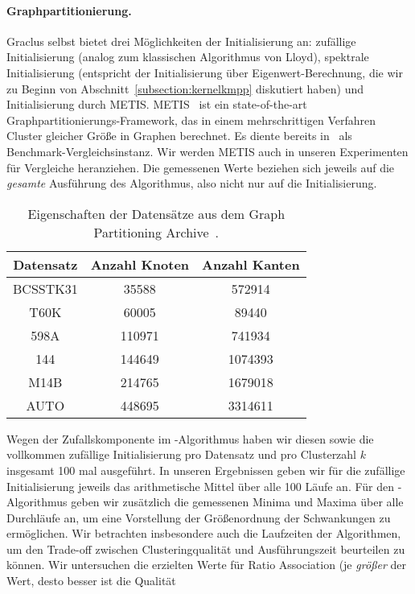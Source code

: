 \paragraph{Graphpartitionierung.} Graclus selbst bietet drei Möglichkeiten der Initialisierung an: zufällige Initialisierung (analog zum klassischen Algorithmus
von Lloyd), spektrale Initialisierung (entspricht der Initialisierung über Eigenwert-Berechnung, die wir zu Beginn von
Abschnitt~\ref{subsection:kernelkmpp} diskutiert haben) und Initialisierung durch METIS. METIS~\cite{KarypisK98} ist ein
state-of-the-art Graphpartitionierungs-Framework, das in einem mehrschrittigen Verfahren Cluster gleicher Größe in Graphen
berechnet. Es diente bereits in~\cite{DhillonGK04,DhillonGK07} als Benchmark-Vergleichsinstanz. Wir werden METIS auch in
unseren Experimenten für Vergleiche heranziehen. Die gemessenen Werte beziehen sich jeweils auf die \emph{gesamte}
Ausführung des Algorithmus, also nicht nur auf die Initialisierung.
\begin{table}[t]
\centering
\begin{tabular}{@{}ccc@{}} \toprule
	\textbf{Datensatz} & \textbf{Anzahl Knoten} & \textbf{Anzahl Kanten} \\ \midrule
	BCSSTK31 & 35588 & 572914 \\
	T60K & 60005 & 89440 \\
	598A & 110971 & 741934 \\
	144 & 144649 & 1074393 \\
	M14B & 214765 & 1679018 \\
	AUTO & 448695 & 3314611 \\
	\bottomrule
\end{tabular}
\caption{Eigenschaften der Datensätze aus dem Graph Partitioning Archive~\cite{SoperWC04}.}
\label{tbl:experiment-kkmpp-datasets}
\end{table}
\absatz
Wegen der Zufallskomponente im \kkmpp-Algorithmus haben wir diesen sowie die vollkommen zufällige Initialisierung pro
Datensatz und pro Clusterzahl $k$ insgesamt 100 mal ausgeführt. In unseren Ergebnissen geben wir für die zufällige Initialisierung
jeweils das arithmetische Mittel über alle 100 Läufe an. Für den \kkmpp-Algorithmus geben wir zusätzlich die gemessenen Minima
und Maxima über alle Durchläufe an, um eine Vorstellung der Größenordnung der Schwankungen zu ermöglichen. Wir betrachten
insbesondere auch die Laufzeiten der Algorithmen, um den Trade-off zwischen Clusteringqualität und Ausführungszeit beurteilen
zu können. Wir untersuchen die erzielten Werte für Ratio Association (je \emph{größer} der Wert, desto besser ist die Qualität
